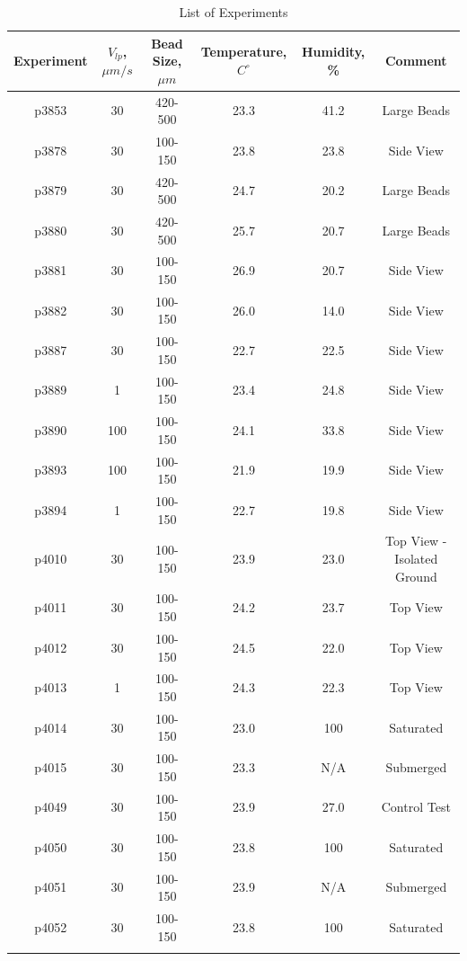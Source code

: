 \clearpage

\begin{landscape}
\begin{table}
\caption{List of Experiments}
\centering
\begin{tabular}{c c c c c c}
\hline
 Experiment & $V_{lp}$, $\mu m/s$ & Bead Size, $\mu m$ & Temperature, $C^\circ$& Humidity, \%& Comment \\
\hline
p3853 & 30   & 420-500 & 23.3 & 41.2 & Large Beads\\
p3878 & 30   & 100-150 & 23.8 & 23.8 & Side View\\
p3879 & 30   & 420-500 & 24.7 & 20.2 & Large Beads\\
p3880 & 30   & 420-500 & 25.7 & 20.7 & Large Beads\\
p3881 & 30   & 100-150 & 26.9 & 20.7 & Side View\\
p3882 & 30   & 100-150 & 26.0 & 14.0 & Side View\\
p3887 & 30   & 100-150 & 22.7 & 22.5 & Side View\\
p3889 & 1     & 100-150 & 23.4 & 24.8 & Side View\\
p3890 & 100 & 100-150 & 24.1 & 33.8 & Side View\\
p3893 & 100 & 100-150 & 21.9 & 19.9 & Side View\\
p3894 & 1     & 100-150 & 22.7 & 19.8 & Side View\\
p4010 & 30   & 100-150 & 23.9 & 23.0 & Top View - Isolated Ground\\
p4011 & 30   & 100-150 & 24.2 & 23.7 & Top View\\
p4012 & 30   & 100-150 & 24.5 & 22.0 & Top View\\
p4013 & 1     & 100-150 & 24.3 & 22.3 & Top View\\
p4014 & 30   & 100-150 & 23.0 & 100  & Saturated\\
p4015 & 30   & 100-150 & 23.3 & N/A  & Submerged\\
p4049 & 30   & 100-150 & 23.9 & 27.0 & Control Test \\
p4050 & 30   & 100-150 & 23.8 & 100  & Saturated \\
p4051 & 30   & 100-150 & 23.9 & N/A  & Submerged \\
p4052 & 30   & 100-150 & 23.8 & 100  & Saturated \\
\hline
\label{exp_list}
\end{tabular}
\end{table}
\end{landscape}


